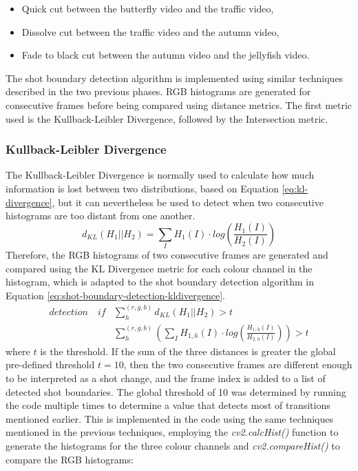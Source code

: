 \begin{itemize}
    \item Quick cut between the butterfly video and the traffic video,
    \item Dissolve cut between the traffic video and the autumn video,
    \item Fade to black cut between the autumn video and the jellyfish video.
\end{itemize}

The shot boundary detection algorithm is implemented using similar techniques described in the two previous phases. RGB histograms are generated for consecutive frames before being compared using distance metrics. The first metric used is the Kullback-Leibler Divergence, followed by the Intersection metric.

\subsubsection{Kullback-Leibler Divergence}

The Kullback-Leibler Divergence is normally used to calculate how much information is lost between two distributions, based on Equation \ref{eq:kl-divergence}, but it can nevertheless be used to detect when two consecutive histograms are too distant from one another.
\begin{equation}
\label{eq:kl-divergence}
    d_{KL}(H_1||H_2)=\sum_I H_1(I)\cdot log(\frac{H_1(I)}{H_2(I)})
\end{equation}
Therefore, the RGB histograms of two consecutive frames are generated and compared using the KL Divergence metric for each colour channel in the histogram, which is adapted to the shot boundary detection algorithm in Equation \ref{eq:shot-boundary-detection-kldivergence}. 
\begin{equation}
\label{eq:shot-boundary-detection-kldivergence}
\begin{aligned}
    detection \quad if & \sum_{h}^{(r,g,b)}d_{KL}(H_1||H_2) > t \\
    & \sum_{h}^{(r,g,b)} (\sum_I H_{1,h}(I)\cdot log(\frac{H_{1,h}(I)}{H_{2,h}(I)})) > t
\end{aligned}
\end{equation}
where $t$ is the threshold. If the sum of the three distances is greater the global pre-defined threshold $t=10$, then the two consecutive frames are different enough to be interpreted as a shot change, and the frame index is added to a list of detected shot boundaries. The global threshold of 10 was determined by running the code multiple times to determine a value that detects most of transitions mentioned earlier. This is implemented in the code using the same techniques mentioned in the previous techniques, employing the \textit{cv2.calcHist()} function to generate the histograms for the three colour channels and \textit{cv2.compareHist()} to compare the RGB histograms:

